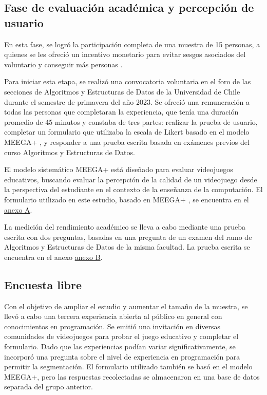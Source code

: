\subsection{Fase de evaluación académica y percepción de usuario}

En esta fase, se logró la participación completa de una muestra de 15 personas, a quienes se les ofreció un incentivo monetario para evitar sesgos asociados del voluntario y conseguir más personas \cite{Marinescu2018IncentivesCR, Dallmeyer2023ToPayOrNot}.

Para iniciar esta etapa, se realizó una convocatoria voluntaria en el foro de las secciones de Algoritmos y Estructuras de Datos de la Universidad de Chile durante el semestre de primavera del año 2023. Se ofreció una remuneración a todas las personas que completaran la experiencia, que tenía una duración promedio de 45 minutos y constaba de tres partes: realizar la prueba de usuario, completar un formulario que utilizaba la escala de Likert basado en el modelo MEEGA+ \cite{meegaplus}, y responder a una prueba escrita basada en exámenes previos del curso Algoritmos y Estructuras de Datos.

El modelo sistemático MEEGA+ \cite{meegaplus} está diseñado para evaluar videojuegos educativos, buscando evaluar la percepción de la calidad de un videojuego desde la perspectiva del estudiante en el contexto de la enseñanza de la computación. El formulario utilizado en este estudio, basado en MEEGA+ \cite{meegaplus}, se encuentra en el \hyperref[AnexoA]{anexo A}.

La medición del rendimiento académico se lleva a cabo mediante una prueba escrita con dos preguntas, basadas en una pregunta de un examen del ramo de Algoritmos y Estructuras de Datos de la misma facultad. La prueba escrita se encuentra en el anexo \hyperref[AnexoB]{anexo B}.


\subsection{Encuesta libre}


Con el objetivo de ampliar el estudio y aumentar el tamaño de la muestra, se llevó a cabo una tercera experiencia abierta al público en general con conocimientos en programación. Se emitió una invitación en diversas comunidades de videojuegos para probar el juego educativo y completar el formulario. Dado que las experiencias podían variar significativamente, se incorporó una pregunta sobre el nivel de experiencia en programación para permitir la segmentación. El formulario utilizado también se basó en el modelo MEEGA+, pero las respuestas recolectadas se almacenaron en una base de datos separada del grupo anterior.


